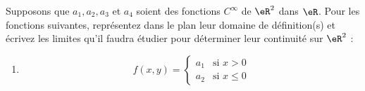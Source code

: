 
\begin{exercice}\label{exo0043}

Supposons que $a_1, a_2, a_3$ et $a_4$ soient des fonctions $C^\infty$ de $\eR^2$ dans $\eR$. Pour les fonctions suivantes, représentez dans le plan leur domaine de définition(s) et écrivez les limites qu'il faudra étudier pour déterminer leur continuité sur $\eR^2$ :

\begin{multicols}{2}
\begin{enumerate}
	\item
	\begin{equation}
		f(x,y)=
		\begin{cases}
			a_1	&	\text{si }x>0\\
			a_2	&	 \text{si }x\leq 0
		\end{cases}
	\end{equation}



\end{enumerate}
\end{multicols}
\end{exercice}
